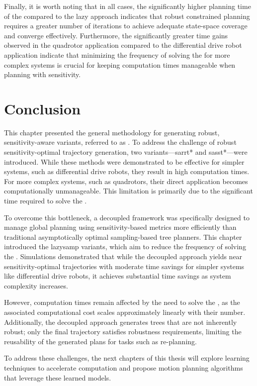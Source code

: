 Finally, it is worth noting that in all cases, the significantly higher planning time of the  compared to the lazy approach indicates that robust constrained planning requires a greater number of iterations to achieve adequate state-space coverage and converge effectively.
Furthermore, the significantly greater time gains observed in the quadrotor application compared to the differential drive robot application indicate that minimizing the frequency of solving the  for more complex systems is crucial for keeping computation times manageable when planning with sensitivity.

\section{Conclusion}\label{sec:concl}

This chapter presented the general methodology for generating robust, sensitivity-aware variants, referred to as . 
To address the challenge of robust sensitivity-optimal trajectory generation, two variants—\gls{sarrt*} and \gls{sasst*}—were introduced. 
While these methods were demonstrated to be effective for simpler systems, such as differential drive robots, they result in high computation times. 
For more complex systems, such as quadrotors, their direct application becomes computationally unmanageable.
This limitation is primarily due to the significant time required to solve the .

To overcome this bottleneck, a decoupled framework was specifically designed to manage global planning using sensitivity-based metrics more efficiently than traditional asymptotically optimal sampling-based tree planners. 
This chapter introduced the \gls{lazysamp} variants, which aim to reduce the frequency of solving the . 
Simulations demonstrated that while the decoupled approach yields near sensitivity-optimal trajectories with moderate time savings for simpler systems like differential drive robots, it achieves substantial time savings as system complexity increases.

However, computation times remain affected by the need to solve the , as the associated computational cost scales approximately linearly with their number.
Additionally, the decoupled approach generates trees that are not inherently robust; only the final trajectory satisfies robustness requirements, limiting the reusability of the generated plans for tasks such as re-planning.

To address these challenges, the next chapters of this thesis will explore learning techniques to accelerate  computation and propose motion planning algorithms that leverage these learned models.